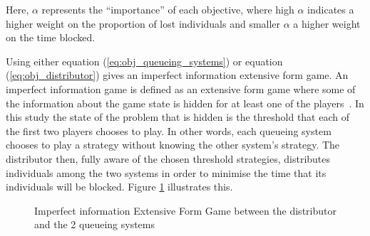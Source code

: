 Here, \(\alpha\) represents the ``importance'' of each objective,
where high \(\alpha\) indicates a higher weight on the proportion of lost 
individuals and smaller \(\alpha\) a higher weight on the time blocked. 

Using either equation (\ref{eq:obj_queueing_systems}) or equation
(\ref{eq:obj_distributor}) gives an imperfect information extensive form game. 
An imperfect information game is defined as an extensive form game where some 
of the information about the game state is hidden for at least one of the 
players~\cite{Berwanger2008}. In this study the state of the problem that is
hidden is the threshold that each of the first two players chooses to play.
In other words, each queueing system chooses to play a strategy without 
knowing the other system's strategy.
The distributor then, fully aware of the chosen threshold strategies, 
distributes individuals among the two systems in order to minimise the time 
that its individuals will be blocked. Figure \ref{fig:imperfect_info_game} 
illustrates this. 

\begin{figure}[ht]
    \centering
    \caption{Imperfect information Extensive Form Game between the distributor 
    and the 2 queueing systems}
    \label{fig:imperfect_info_game}
\end{figure}

